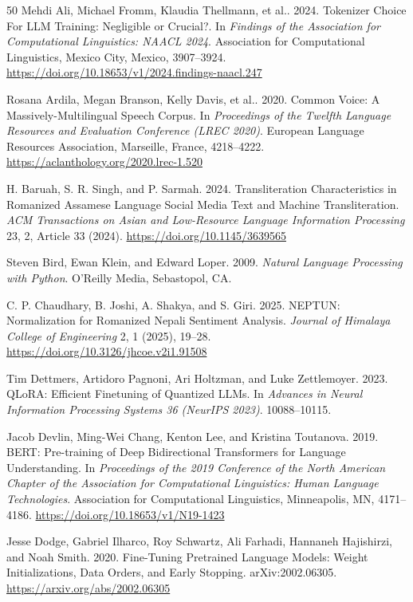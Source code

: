 \documentclass{article}
\begin{document}
\begin{thebibliography}{50}
\small
{}
Mehdi Ali, Michael Fromm, Klaudia Thellmann, et al.. 2024. Tokenizer Choice For LLM Training: Negligible or Crucial?. In \emph{Findings of the Association for Computational Linguistics: NAACL 2024}. Association for Computational Linguistics, Mexico City, Mexico, 3907–3924. \url{https://doi.org/10.18653/v1/2024.findings-naacl.247}

Rosana Ardila, Megan Branson, Kelly Davis, et al.. 2020. Common Voice: A Massively-Multilingual Speech Corpus. In \emph{Proceedings of the Twelfth Language Resources and Evaluation Conference (LREC 2020)}. European Language Resources Association, Marseille, France, 4218–4222. \url{https://aclanthology.org/2020.lrec-1.520}

H. Baruah, S. R. Singh, and P. Sarmah. 2024. Transliteration Characteristics in Romanized Assamese Language Social Media Text and Machine Transliteration. \emph{ACM Transactions on Asian and Low-Resource Language Information Processing} 23, 2, Article 33 (2024). \url{https://doi.org/10.1145/3639565}

Steven Bird, Ewan Klein, and Edward Loper. 2009. \emph{Natural Language Processing with Python}. O'Reilly Media, Sebastopol, CA.

C. P. Chaudhary, B. Joshi, A. Shakya, and S. Giri. 2025. NEPTUN: Normalization for Romanized Nepali Sentiment Analysis. \emph{Journal of Himalaya College of Engineering} 2, 1 (2025), 19–28. \url{https://doi.org/10.3126/jhcoe.v2i1.91508}

Tim Dettmers, Artidoro Pagnoni, Ari Holtzman, and Luke Zettlemoyer. 2023. QLoRA: Efficient Finetuning of Quantized LLMs. In \emph{Advances in Neural Information Processing Systems 36 (NeurIPS 2023)}. 10088–10115.

Jacob Devlin, Ming-Wei Chang, Kenton Lee, and Kristina Toutanova. 2019. BERT: Pre-training of Deep Bidirectional Transformers for Language Understanding. In \emph{Proceedings of the 2019 Conference of the North American Chapter of the Association for Computational Linguistics: Human Language Technologies}. Association for Computational Linguistics, Minneapolis, MN, 4171–4186. \url{https://doi.org/10.18653/v1/N19-1423}

Jesse Dodge, Gabriel Ilharco, Roy Schwartz, Ali Farhadi, Hannaneh Hajishirzi, and Noah Smith. 2020. Fine-Tuning Pretrained Language Models: Weight Initializations, Data Orders, and Early Stopping. arXiv:2002.06305. \url{https://arxiv.org/abs/2002.06305}


\end{thebibliography}
\end{document}
